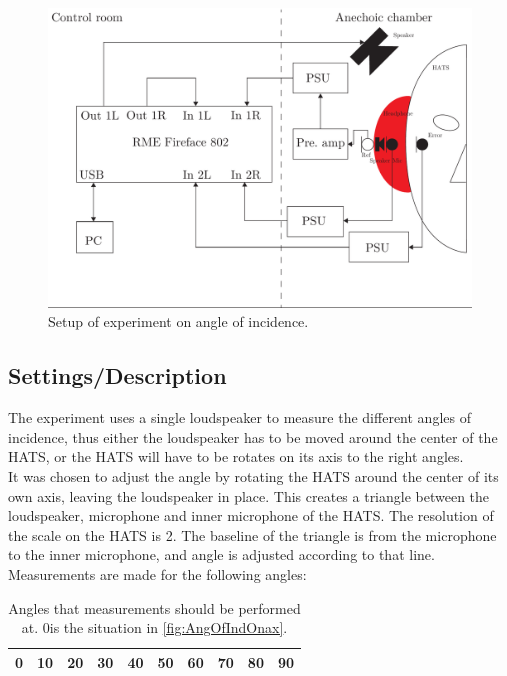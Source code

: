 \begin{figure}[H]
	\centering
	\includegraphics[width=\textwidth]{../Journal/Experiments/AngleOfIncidence/AngleOfIncidenceSetup.pdf}
	\caption{Setup of experiment on angle of incidence.}
	\label{Fig:AngleOfIncidenceSetup}
\end{figure}



\subsection{Settings/Description}\label{sec:AngleDescription}
The experiment uses a single loudspeaker to measure the  different angles of incidence, thus either the loudspeaker has to be moved around the center of the HATS, or the HATS will have to be rotates on its axis to the right angles. \\
It was chosen to adjust the angle by rotating the HATS around the center of its own axis, leaving the loudspeaker in place. This creates a triangle between the loudspeaker, microphone and inner microphone of the HATS. The resolution of the scale on the HATS is 2\degrees. The baseline of the triangle is from the microphone to the inner microphone, and angle is adjusted according to that line.
Measurements are made for the following angles:
\begin{table}[H]
	\centering
	\begin{tabular}{c c c c c c c c c c} \toprule
		0\degrees & 10\degrees & 20\degrees & 30\degrees & 40\degrees & 50\degrees & 60\degrees & 70\degrees & 80\degrees & 90\degrees \\ \bottomrule
	\end{tabular}
\caption{Angles that measurements should be performed at. 0\degrees  is the situation in \autoref{fig:AngOfIndOnax}.}
\label{Tab:AngleOfInciMeasAngles}
\end{table}
 

